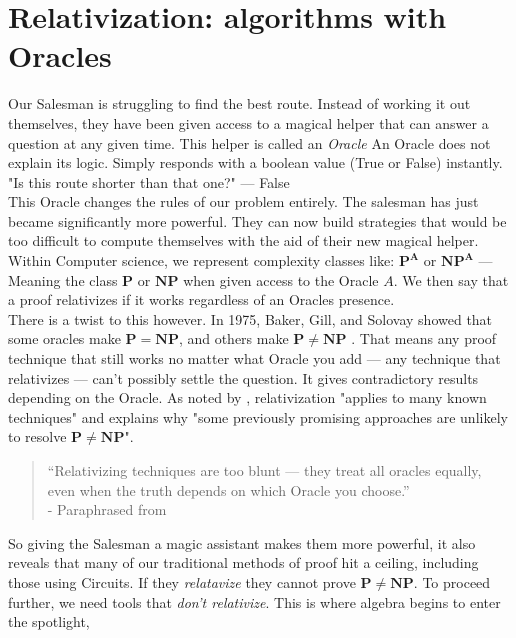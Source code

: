 \documentclass[12pt]{report}
\begin{document}
\section{Relativization: algorithms with Oracles}
Our Salesman is struggling to find the best route.
Instead of working it out themselves, they have been given access to a magical helper that can answer a question at any given time.
This helper is called an \textit{Oracle}
An Oracle does not explain its logic.
Simply responds with a boolean value (True or False) instantly.\\
"Is this route shorter than that one?" --- False\\
This Oracle changes the rules of our problem entirely.
The salesman has just became significantly more powerful.
They can now build strategies that would be too difficult to compute themselves with the aid of their new magical helper.
Within Computer science, we represent complexity classes like: $\mathbf{P^A}$ or $\mathbf{NP^A}$ --- Meaning the class $\mathbf{P}$ or $\mathbf{NP}$ when given access to the Oracle $A$.
We then say that a proof relativizes if it works regardless of an Oracles presence.\\
There is a twist to this however.
In 1975, Baker, Gill, and Solovay showed that some oracles make $\mathbf{P = NP}$, and others make $\mathbf{P \ne NP}$ \citep{baker1975relativizations}.
That means any proof technique that still works no matter what Oracle you add --- any technique that relativizes --- can't possibly settle the question.
It gives contradictory results depending on the Oracle.
As noted by \cite{arora2009}, relativization "applies to many known techniques" and explains why "some previously promising approaches are unlikely to resolve $\mathbf{P \ne NP}$".
\begin{quote}
    “Relativizing techniques are too blunt — they treat all oracles equally, even when the truth depends on which Oracle you choose.”\\
    - Paraphrased from \cite{baker1975relativizations}
\end{quote}
So giving the Salesman a magic assistant makes them more powerful, it also reveals that many of our traditional methods of proof hit a ceiling, including those using Circuits.
If they \textit{relatavize} they cannot prove  $\mathbf{P \ne NP}$.
To proceed further, we need tools that \textit{don't relativize}.
This is where algebra begins to enter the spotlight,
\end{document}
